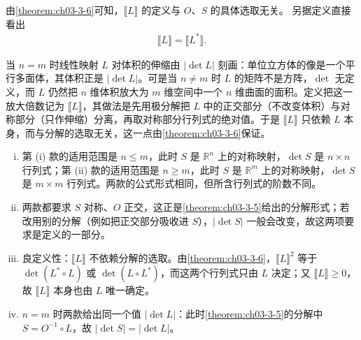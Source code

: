 \documentclass[../../main.tex]{subfiles}%
\begin{document}
\begin{remark}\label{remark:ch03-def-3-4-独立性}
由\cref{theorem:ch03-3-6}可知，$\llbracket L\rrbracket$ 的定义与 $O$、$S$ 的具体选取无关。%
另据定义直接看出
\begin{align*}
\llbracket L\rrbracket=\llbracket L^*\rrbracket.
\end{align*}
\end{remark}

\begin{remark}\label{remark:ch03-def-3-4-动机}
当 $n=m$ 时线性映射 $L$ 对体积的伸缩由 $\lvert\det L\rvert$ 刻画：单位立方体的像是一个平行多面体，其体积正是 $\lvert\det L\rvert$。可是当 $n\neq m$ 时 $L$ 的矩阵不是方阵，$\det$ 无定义，而 $L$ 仍然把 $n$ 维体积放大为 $m$ 维空间中一个 $n$ 维曲面的面积。定义把这一放大倍数记为 $\llbracket L\rrbracket$，其做法是先用极分解把 $L$ 中的正交部分（不改变体积）与对称部分（只作伸缩）分离，再取对称部分行列式的绝对值。于是 $\llbracket L\rrbracket$ 只依赖 $L$ 本身，而与分解的选取无关，这一点由\cref{theorem:ch03-3-6}保证。%
\end{remark}

\begin{remark}\label{remark:ch03-def-3-4-条件}
\begin{enumerate}[(i)]
\item 第 (i) 款的适用范围是 $n\leqslant m$，此时 $S$ 是 $\mathbb{R}^n$ 上的对称映射，$\det S$ 是 $n\times n$ 行列式；第 (ii) 款的适用范围是 $n\geqslant m$，此时 $S$ 是 $\mathbb{R}^m$ 上的对称映射，$\det S$ 是 $m\times m$ 行列式。两款的公式形式相同，但所含行列式的阶数不同。
\item 两款都要求 $S$ 对称、$O$ 正交，这正是\cref{theorem:ch03-3-5}给出的分解形式；若改用别的分解（例如把正交部分吸收进 $S$），$\lvert\det S\rvert$ 一般会改变，故这两项要求是定义的一部分。%
\item 良定义性：$\llbracket L\rrbracket$ 不依赖分解的选取。由\cref{theorem:ch03-3-6}，$\llbracket L\rrbracket^2$ 等于 $\det(L^*\circ L)$ 或 $\det(L\circ L^*)$，而这两个行列式只由 $L$ 决定；又 $\llbracket L\rrbracket\geqslant0$，故 $\llbracket L\rrbracket$ 本身也由 $L$ 唯一确定。%
\item $n=m$ 时两款给出同一个值 $\lvert\det L\rvert$：此时\cref{theorem:ch03-3-5}的分解中 $S=O^{-1}\circ L$，故 $\lvert\det S\rvert=\lvert\det L\rvert$。%
\end{enumerate}
\end{remark}
\end{document}
